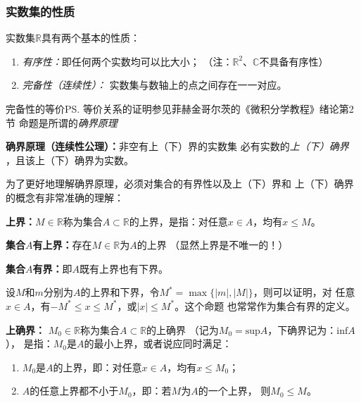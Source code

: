 \subsubsection{实数集的性质}

实数集$\mathbb{R}$具有两个基本的性质：
\begin{enumerate} 
	\setlength{\itemindent}{1cm}
  \item {\it 有序性：}即任何两个实数均可以比大小；
  \hfill （注：$\mathbb{R}^2$、$\mathbb{C}$不具备有序性） 
  \item {\it 完备性（连续性）： }实数集与数轴上的点之间存在一一对应。
\end{enumerate}

完备性的等价\ps{等价关系的证明参见菲赫金哥尔茨的《微积分学教程》绪论第2节}
命题是所谓的{\it 确界原理}
\begin{thx}
	{\bf 确界原理（连续性公理）：}非空有上（下）界的实数集
	必有实数的{\it 上（下）确界} ，且该上（下）确界为实数。
\end{thx}
为了更好地理解确界原理，必须对集合的有界性以及上（下）界和
上（下）确界的概念有非常准确的理解：
\begin{thx}
	{\bf 上界：}$M\in\mathbb{R}$称为集合$A\subset\mathbb{R}$的上界，是指：对任意$x\in A$，均有$x\leq M$。
	
	{\bf 集合$A$有上界：}存在$M\in\mathbb{R}$为$A$的上界
	（显然上界是不唯一的！）
	
	{\bf 集合$A$有界：}即$A$既有上界也有下界。
\end{thx}	
设$M$和$m$分别为$A$的上界和下界，令$M^*=\max\{|m|,|M|\}$，则可以证明，对
任意$x\in A$，有$-M^*\leq x\leq M^*$，或$|x|\leq M^*$。这个命题
也常常作为集合有界的定义。
\begin{thx}
	{\bf 上确界：}
	$M_0\in\mathbb{R}$称为集合$A\subset\mathbb{R}$的上确界
	（记为$M_0=\mathrm{sup}A$，下确界记为：$\mathrm{inf}A$），
	是指：$M_0$是$A$的最小上界，或者说应同时满足：
	\begin{enumerate}[(1)]
	  \item $M_0$是$A$的上界，即：对任意$x\in A$，均有$x\leq M_0$；
	  \item $A$的任意上界都不小于$M_0$，即：若$M$为$A$的一个上界，
	  则$M_0\leq M$。
	\end{enumerate}
\end{thx}


